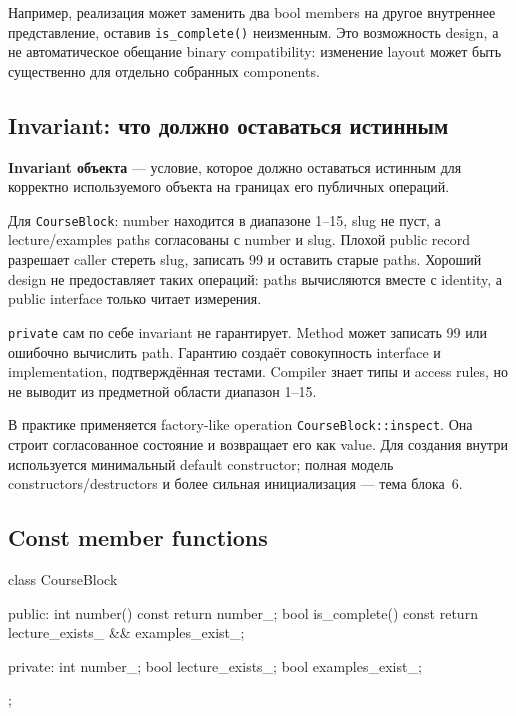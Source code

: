 Например, реализация может заменить два bool members на другое внутреннее
представление, оставив \texttt{is\_complete()} неизменным. Это возможность
design, а не автоматическое обещание binary compatibility: изменение layout
может быть существенно для отдельно собранных components.

\subsection{Invariant: что должно оставаться истинным}

\begin{definition}
\textbf{Invariant объекта} --- условие, которое должно оставаться истинным для
корректно используемого объекта на границах его публичных операций.
\end{definition}

Для \texttt{CourseBlock}: number находится в диапазоне 1--15, slug не пуст,
а lecture/examples paths согласованы с number и slug. Плохой public record
разрешает caller стереть slug, записать 99 и оставить старые paths. Хороший
design не предоставляет таких операций: paths вычисляются вместе с identity,
а public interface только читает измерения.

\texttt{private} сам по себе invariant не гарантирует. Method может записать
99 или ошибочно вычислить path. Гарантию создаёт совокупность interface и
implementation, подтверждённая тестами. Compiler знает типы и access rules,
но не выводит из предметной области диапазон 1--15.

В практике применяется factory-like operation \texttt{CourseBlock::inspect}.
Она строит согласованное состояние и возвращает его как value. Для создания
внутри используется минимальный default constructor; полная модель
constructors/destructors и более сильная инициализация --- тема блока~6.

\subsection{Const member functions}

\begin{cppcode}
class CourseBlock {
public:
    int number() const { return number_; }
    bool is_complete() const {
        return lecture_exists_ && examples_exist_;
    }

private:
    int number_{};
    bool lecture_exists_{};
    bool examples_exist_{};
};
\end{cppcode}


